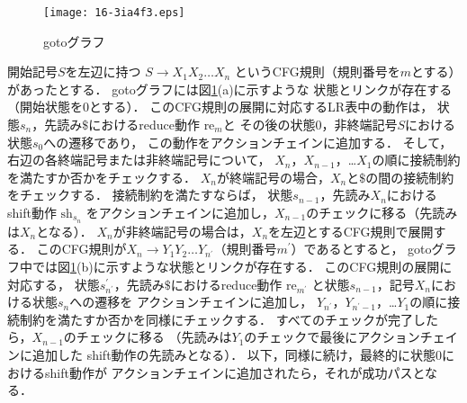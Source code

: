 \documentclass[japanese]{jnlp_1.4}
\begin{document}
\begin{figure}[b]
\begin{center}
\texttt{[image: 16-3ia4f3.eps]}
\end{center}
  \caption{gotoグラフ}
  \label{fig:proposed}
\end{figure}

開始記号$S$を左辺に持つ $S\to X_1X_2\dots X_n$
というCFG規則（規則番号を$m$とする）があったとする．
gotoグラフには図\ref{fig:proposed}(a)に示すような
状態とリンクが存在する（開始状態を0とする）．
このCFG規則の展開に対応するLR表中の動作は，
状態$s_n$，先読み$\$$におけるreduce動作 $\mbox{re}_m$と
その後の状態0，非終端記号$S$における状態$s_0$への遷移であり，
この動作をアクションチェインに追加する．
そして，右辺の各終端記号または非終端記号について，
$X_n$，$X_{n-1}$，…$X_1$の順に接続制約を満たすか否かをチェックする．
$X_n$が終端記号の場合，$X_n$と$\$$の間の接続制約をチェックする．
接続制約を満たすならば，
状態$s_{n-1}$，先読み$X_n$におけるshift動作 $\mbox{sh}_{s_n}$
をアクションチェインに追加し，$X_{n-1}$のチェックに移る（先読みは$X_n$となる）．
$X_n$が非終端記号の場合は，$X_n$を左辺とするCFG規則で展開する．
このCFG規則が$X_n\to Y_1Y_2\dots Y_{n^{\prime}}$（規則番号$m^{\prime}$）であるとすると，
gotoグラフ中では図\ref{fig:proposed}(b)に示すような状態とリンクが存在する．
このCFG規則の展開に対応する，
状態$s^{\prime}_{n^{\prime}}$，先読み$\$$におけるreduce動作 $\mbox{re}_{m^{\prime}}$
と状態$s_{n-1}$，記号$X_n$における状態$s_n$への遷移を
アクションチェインに追加し，
$Y_{n^{\prime}}$，$Y_{n^{\prime}-1}$，…$Y_1$の順に接続制約を満たすか否かを同様にチェックする．
すべてのチェックが完了したら，$X_{n-1}$のチェックに移る
（先読みは$Y_1$のチェックで最後にアクションチェインに追加した
shift動作の先読みとなる）．
以下，同様に続け，最終的に状態0におけるshift動作が
アクションチェインに追加されたら，それが成功パスとなる．
\end{document}
